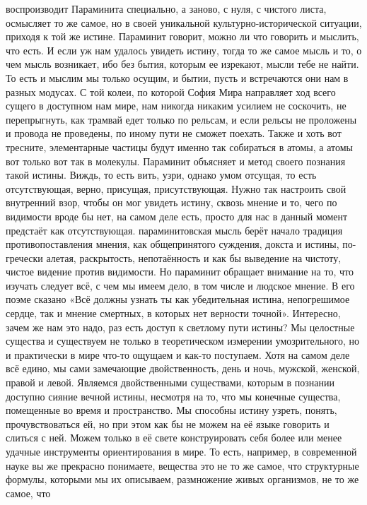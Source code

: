 воспроизводит Параминита специально, а заново, с нуля, с чистого листа,
осмысляет то же самое, но в своей уникальной культурно-исторической ситуации,
приходя к той же истине. Параминит говорит, можно ли что говорить и мыслить, что
есть. И если уж нам удалось увидеть истину, тогда то же самое мысль и то, о чем
мысль возникает, ибо без бытия, которым ее изрекают, мысли тебе не найти. То
есть и мыслим мы только осущим, и бытии, пусть и встречаются они нам в разных
модусах. С той колеи, по которой София Мира направляет ход всего сущего в
доступном нам мире, нам никогда никаким усилием не соскочить, не перепрыгнуть,
как трамвай едет только по рельсам, и если рельсы не проложены и провода не
проведены, по иному пути не сможет поехать. Также и хоть вот тресните,
элементарные частицы будут именно так собираться в атомы, а атомы вот только вот
так в молекулы. Параминит объясняет и метод своего познания такой истины. Виждь,
то есть вить, узри, однако умом отсущая, то есть отсутствующая, верно, присущая,
присутствующая. Нужно так настроить свой внутренний взор, чтобы он мог увидеть
истину, сквозь мнение и то, чего по видимости вроде бы нет, на самом деле есть,
просто для нас в данный момент предстаёт как отсутствующая. параминитовская
мысль берёт начало традиция противопоставления мнения, как общепринятого
суждения, докста и истины, по-гречески алетая, раскрытость, непотаённость и как
бы выведение на чистоту, чистое видение против видимости. Но параминит обращает
внимание на то, что изучать следует всё, с чем мы имеем дело, в том числе и
людское мнение. В его поэме сказано «Всё должны узнать ты как убедительная
истина, непогрешимое сердце, так и мнение смертных, в которых нет верности
точной». Интересно, зачем же нам это надо, раз есть доступ к светлому пути
истины? Мы целостные существа и существуем не только в теоретическом измерении
умозрительного, но и практически в мире что-то ощущаем и как-то поступаем. Хотя
на самом деле всё едино, мы сами замечающие двойственность, день и ночь,
мужской, женской, правой и левой. Являемся двойственными существами, которым в
познании доступно сияние вечной истины, несмотря на то, что мы конечные
существа, помещенные во время и пространство. Мы способны истину узреть, понять,
прочувствоваться ей, но при этом как бы не можем на её языке говорить и слиться
с ней. Можем только в её свете конструировать себя более или менее удачные
инструменты ориентирования в мире. То есть, например, в современной науке вы же
прекрасно понимаете, вещества это не то же самое, что структурные формулы,
которыми мы их описываем, размножение живых организмов, не то же самое, что
